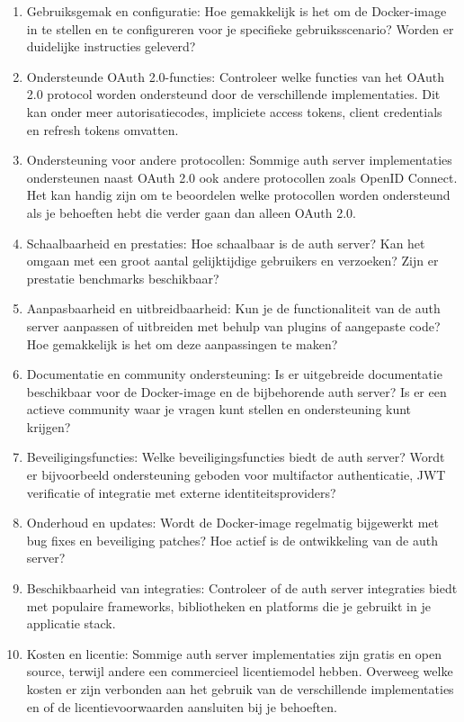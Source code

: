 \begin{enumerate}
  \item Gebruiksgemak en configuratie: Hoe gemakkelijk is het om de Docker-image in te stellen en te configureren voor je specifieke gebruiksscenario? Worden er duidelijke instructies geleverd?

  \item Ondersteunde OAuth 2.0-functies: Controleer welke functies van het OAuth 2.0 protocol worden ondersteund door de verschillende implementaties. Dit kan onder meer autorisatiecodes, impliciete access tokens, client credentials en refresh tokens omvatten.
  
  \item Ondersteuning voor andere protocollen: Sommige auth server implementaties ondersteunen naast OAuth 2.0 ook andere protocollen zoals OpenID Connect. Het kan handig zijn om te beoordelen welke protocollen worden ondersteund als je behoeften hebt die verder gaan dan alleen OAuth 2.0.
  
  \item Schaalbaarheid en prestaties: Hoe schaalbaar is de auth server? Kan het omgaan met een groot aantal gelijktijdige gebruikers en verzoeken? Zijn er prestatie benchmarks beschikbaar?
  
  \item Aanpasbaarheid en uitbreidbaarheid: Kun je de functionaliteit van de auth server aanpassen of uitbreiden met behulp van plugins of aangepaste code? Hoe gemakkelijk is het om deze aanpassingen te maken?
  
  \item Documentatie en community ondersteuning: Is er uitgebreide documentatie beschikbaar voor de Docker-image en de bijbehorende auth server? Is er een actieve community waar je vragen kunt stellen en ondersteuning kunt krijgen?
  
  \item Beveiligingsfuncties: Welke beveiligingsfuncties biedt de auth server? Wordt er bijvoorbeeld ondersteuning geboden voor multifactor authenticatie, JWT verificatie of integratie met externe identiteitsproviders?
  
  \item Onderhoud en updates: Wordt de Docker-image regelmatig bijgewerkt met bug fixes en beveiliging patches? Hoe actief is de ontwikkeling van de auth server?
  
  \item Beschikbaarheid van integraties: Controleer of de auth server integraties biedt met populaire frameworks, bibliotheken en platforms die je gebruikt in je applicatie stack.
  
  \item Kosten en licentie: Sommige auth server implementaties zijn gratis en open source, terwijl andere een commercieel licentiemodel hebben. Overweeg welke kosten er zijn verbonden aan het gebruik van de verschillende implementaties en of de licentievoorwaarden aansluiten bij je behoeften.
\end{enumerate}

